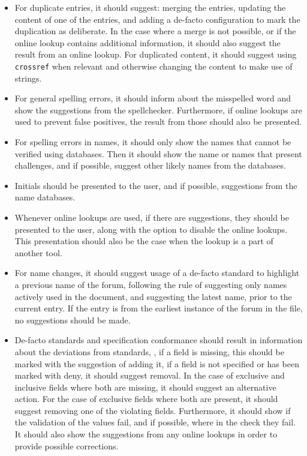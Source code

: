 \begin{itemize}
\item For duplicate entries, it should suggest: merging the entries,
  updating the content of one of the entries, and adding a de-facto
  configuration to mark the duplication as deliberate.  In the case
  where a merge is not possible, or if the online lookup contains
  additional information, it should also suggest the result from an
  online lookup.  For duplicated content, it should suggest using
  \texttt{crossref} when relevant and otherwise changing the content
  to make use of strings.

\item For general spelling errors, it should inform about the
  misspelled word and show the suggestions from the spellchecker.
  Furthermore, if online lookups are used to prevent false positives,
  the result from those should also be presented.

\item For spelling errors in names, it should only show the names that
  cannot be verified using databases.  Then it should show the name or
  names that present challenges, and if possible, suggest other likely
  names from the databases.

\item Initials should be presented to the user, and if possible,
  suggestions from the name databases.

\item Whenever online lookups are used, if there are suggestions, they
  should be presented to the user, along with the option to disable
  the online lookups.  This presentation should also be the case when
  the lookup is a part of another tool.

\item For name changes, it should suggest usage of a de-facto standard
  to highlight a previous name of the forum, following the rule of
  suggesting only names actively used in the document, and suggesting
  the latest name, prior to the current entry.  If the entry is from
  the earliest instance of the forum in the file, no suggestions
  should be made.

\item De-facto standards and specification conformance should result
  in information about the deviations from standards, \ie, if a field
  is missing, this should be marked with the suggestion of adding it,
  if a field is not specified or has been marked with deny, it should
  suggest removal.  In the case of exclusive and inclusive fields
  where both are missing, it should suggest an alternative action.
  For the case of exclusive fields where both are present, it should
  suggest removing one of the violating fields.  Furthermore, it
  should show if the validation of the values fail, and if possible,
  where in the check they fail.  It should also show the suggestions
  from any online lookups in order to provide possible corrections.


\end{itemize}

